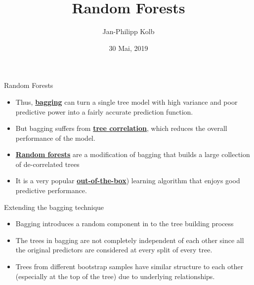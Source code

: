 \documentclass[
  10pt,
  ignorenonframetext,
]{beamer}
\title{Random Forests}
\author{Jan-Philipp Kolb}
\date{30 Mai, 2019}
\providecommand{\tightlist}{%
  \setlength{\itemsep}{0pt}\setlength{\parskip}{0pt}}
\begin{document}
\frame{\titlepage}

\begin{frame}{Random Forests}
\protect\hypertarget{random-forests}{}

\begin{itemize}
\tightlist
\item
  Thus,
  \href{https://en.wikipedia.org/wiki/Bootstrap_aggregating}{\textbf{bagging}}
  can turn a single tree model with high variance and poor predictive
  power into a fairly accurate prediction function.
\item
  But bagging suffers from
  \href{https://stats.stackexchange.com/questions/295868/why-is-tree-correlation-a-problem-when-working-with-bagging}{\textbf{tree
  correlation}}, which reduces the overall performance of the model.
\item
  \href{https://en.wikipedia.org/wiki/Random_forest}{\textbf{Random
  forests}} are a modification of bagging that builds a large collection
  of de-correlated trees
\item
  It is a very popular
  \href{https://en.wikipedia.org/wiki/Out_of_the_box_(feature)}{\textbf{out-of-the-box}})
  learning algorithm that enjoys good predictive performance.
\end{itemize}

\end{frame}

\begin{frame}{Extending the bagging technique}
\protect\hypertarget{extending-the-bagging-technique}{}

\begin{itemize}
\tightlist
\item
  Bagging introduces a random component in to the tree building process 
\item
  The trees in bagging are not completely independent of each other
  since all the original predictors are considered at every split of
  every tree.
\item
  Trees from different bootstrap samples have similar structure to each
  other (especially at the top of the tree) due to underlying
  relationships.
\end{itemize}

\end{frame}
\end{document}
